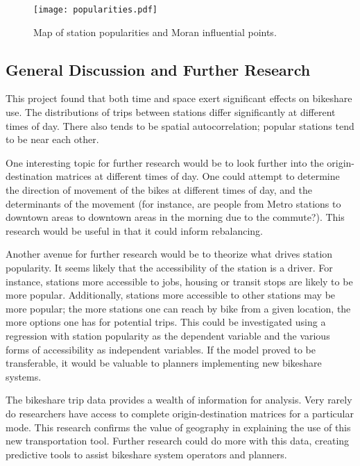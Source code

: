 \documentclass[letterpaper,11pt]{article}
\begin{document}
\begin{figure}[t]
  \texttt{[image: popularities.pdf]}
  \caption{\label{fig:map} Map of station popularities and Moran
    influential points.}
\end{figure}

\subsection{General Discussion and Further Research}

This project found that both time and space exert significant effects
on bikeshare use. The distributions of trips between stations differ
significantly at different times of day. There also tends to be
spatial autocorrelation; popular stations tend to be near each other.

One interesting topic for further research would be to look further
into the origin-destination matrices at different times of day. One
could attempt to determine the direction of movement of the bikes at
different times of day, and the determinants of the movement (for
instance, are people from Metro stations to downtown areas to downtown
areas in the morning due to the commute?). This research would be useful
in that it could inform rebalancing.

Another avenue for further research would be to theorize what drives
station popularity. It seems likely that the accessibility of the
station is a driver. For instance, stations more accessible to jobs,
housing or transit stops are likely to be more popular. Additionally,
stations more accessible to other stations may be more popular; the
more stations one can reach by bike from a given location, the more
options one has for potential trips. This could be investigated using
a regression with station popularity as the dependent variable and the
various forms of accessibility as independent variables. If the model
proved to be transferable, it would be valuable to planners
implementing new bikeshare systems.

The bikeshare trip data provides a wealth of information for
analysis. Very rarely do researchers have access to complete
origin-destination matrices for a particular mode. This research
confirms the value of geography in explaining the use of this new
transportation tool. Further research could do more with this data,
creating predictive tools to assist bikeshare system operators and
planners.

\clearpage\newpage
\printbibliography
\end{document}
